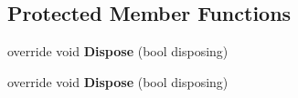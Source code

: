 \subsection*{Protected Member Functions}
\begin{DoxyCompactItemize}
\item 
\hypertarget{class_silent_orbit_1_1_protocol_buffers_1_1_position_stream_a78d07ace32dc662ce6388f52d24bd399}{}override void {\bfseries Dispose} (bool disposing)\label{class_silent_orbit_1_1_protocol_buffers_1_1_position_stream_a78d07ace32dc662ce6388f52d24bd399}

\item 
\hypertarget{class_silent_orbit_1_1_protocol_buffers_1_1_position_stream_a78d07ace32dc662ce6388f52d24bd399}{}override void {\bfseries Dispose} (bool disposing)\label{class_silent_orbit_1_1_protocol_buffers_1_1_position_stream_a78d07ace32dc662ce6388f52d24bd399}

\end{DoxyCompactItemize}
